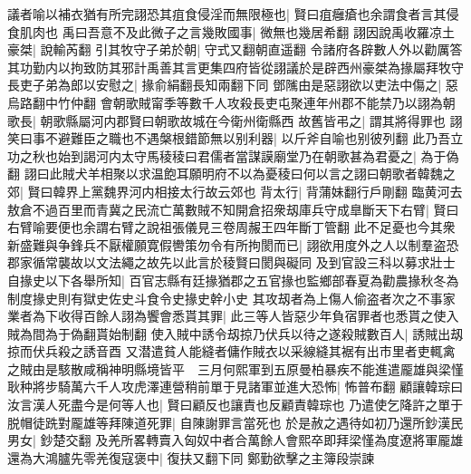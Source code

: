 議者喻以補衣猶有所完詡恐其疽食侵淫而無限極也|{
	賢曰疽癰瘡也余謂食者言其侵食肌肉也}
禹曰吾意不及此微子之言幾敗國事|{
	微無也幾居希翻}
詡因說禹收羅凉土豪桀|{
	說輸芮翻}
引其牧守子弟於朝|{
	守式又翻朝直遥翻}
令諸府各辟數人外以勸厲答其功勤内以拘致防其邪計禹善其言更集四府皆從詡議於是辟西州豪桀為掾屬拜牧守長吏子弟為郎以安慰之|{
	掾俞絹翻長知兩翻下同}
鄧隲由是惡詡欲以吏法中傷之|{
	惡烏路翻中竹仲翻}
會朝歌賊甯季等數千人攻殺長吏屯聚連年州郡不能禁乃以詡為朝歌長|{
	朝歌縣屬河内郡賢曰朝歌故城在今衛州衛縣西}
故舊皆弔之|{
	謂其將得罪也}
詡笑曰事不避難臣之職也不遇槃根錯節無以别利器|{
	以斤斧自喻也别彼列翻}
此乃吾立功之秋也始到謁河内太守馬稜稜曰君儒者當謀謨廟堂乃在朝歌甚為君憂之|{
	為于偽翻}
詡曰此賊犬羊相聚以求温飽耳願明府不以為憂稜曰何以言之詡曰朝歌者韓魏之郊|{
	賢曰韓界上黨魏界河内相接太行故云郊也}
背太行|{
	背蒲妹翻行戶剛翻}
臨黄河去敖倉不過百里而青冀之民流亡萬數賊不知開倉招衆刼庫兵守成臯斷天下右臂|{
	賢曰右臂喻要便也余謂右臂之說祖張儀見三卷周赧王四年斷丁管翻}
此不足憂也今其衆新盛難與争鋒兵不厭權願寛假轡策勿令有所拘閡而已|{
	詡欲用度外之人以制羣盗恐郡家循常襲故以文法繩之故先以此言於稜賢曰閡與礙同}
及到官設三科以募求壯士自掾史以下各舉所知|{
	百官志縣有廷掾猶郡之五官掾也監鄉部春夏為勸農掾秋冬為制度掾史則有獄史佐史斗食令史掾史幹小史}
其攻刼者為上傷人偷盗者次之不事家業者為下收得百餘人詡為饗會悉貰其罪|{
	此三等人皆惡少年負宿罪者也悉貰之使入賊為間為于偽翻貰始制翻}
使入賊中誘令刼掠乃伏兵以待之遂殺賊數百人|{
	誘賊出刼掠而伏兵殺之誘音酉}
又潜遣貧人能縫者傭作賊衣以采線縫其裾有出市里者吏輒禽之賊由是駭散咸稱神明縣境皆平　三月何熙軍到五原曼柏暴疾不能進遣龎雄與梁慬耿种將步騎萬六千人攻虎澤連營稍前單于見諸軍並進大恐怖|{
	怖普布翻}
顧讓韓琮曰汝言漢人死盡今是何等人也|{
	賢曰顧反也讓責也反顧責韓琮也}
乃遣使乞降許之單于脱帽徒跣對龎雄等拜陳道死罪|{
	自陳謝罪言當死也}
於是赦之遇待如初乃還所鈔漢民男女|{
	鈔楚交翻}
及羌所畧轉賣入匈奴中者合萬餘人會熙卒即拜梁慬為度遼將軍龎雄還為大鴻臚先零羌復寇褒中|{
	復扶又翻下同}
鄭勤欲擊之主簿段崇諫


